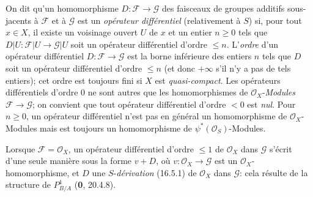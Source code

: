 On dit qu'un homomorphisme $D:\mathscr{F}\to\mathscr{G}$ des faisceaux de
groupes additifs sous-jacents à $\mathscr{F}$ et à $\mathscr{G}$ est un
\emph{opérateur différentiel} (relativement à $S$) si, pour tout $x\in X$, il
existe un voisinage ouvert $U$ de $x$ et un entier $n\geq0$ tels que
$D|U:\mathscr{F}|U\to\mathscr{G}|U$ soit un opérateur différentiel d'ordre
$\leq n$. L'\emph{ordre} d'un opérateur différentiel
$D:\mathscr{F}\to\mathscr{G}$ est la borne inférieure des entiers $n$ tels
que $D$ soit un opérateur différentiel d'ordre $\leq n$ (et donc $+\infty$
s'il n'y a pas de tels entiers); cet ordre est toujours fini si $X$ est
\emph{quasi-compact}. Les opérateurs différentiels d'ordre $0$ ne sont autres
que les homomorphismes de $\mathcal{O}_X$-\emph{Modules}
$\mathscr{F}\to\mathscr{G}$; on convient que tout opérateur différentiel
d'ordre $<0$ est \emph{nul}. Pour $n\geq0$, un opérateur différentiel n'est
pas en général un homomorphisme de $\mathcal{O}_X$-Modules mais est toujours
un homomorphisme de $\psi^*(\mathcal{O}_S)$-Modules.

Lorsque $\mathscr{F}=\mathcal{O}_X$, un opérateur différentiel d'ordre
$\leq1$ de $\mathcal{O}_X$ dans $\mathscr{G}$ s'écrit d'une seule manière
sous la forme $v+D$, où $v:\mathcal{O}_X\to\mathscr{G}$ est un
$\mathcal{O}_X$-homomorphisme, et $D$ une $S$-\emph{dérivation} (16.5.1) de
$\mathcal{O}_X$ dans $\mathscr{G}$: cela résulte de la structure de
$P_{B/A}^1$ (\textbf{0}, 20.4.8).

